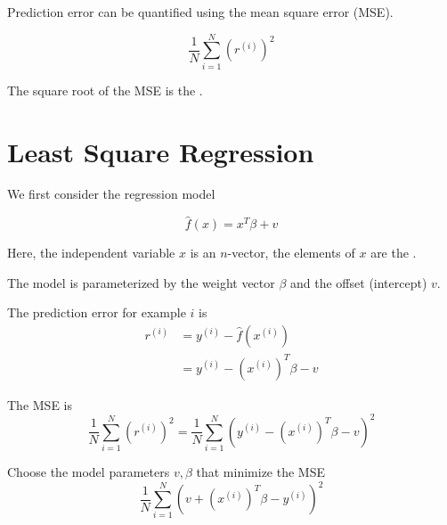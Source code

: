 Prediction error can be quantified using the mean square error (MSE).

\begin{definition}
    $$
\frac{1}{N} \sum_{i=1}^{N}\left(r^{(i)}\right)^{2}
$$
\end{definition}

The square root of the MSE is the .

\section{Least Square Regression}

We first consider the regression model

\begin{problem}
    $$
    \hat{f}(x)=x^{T} \beta+v
    $$ 

    Here, the independent variable $ x $ is an $ n $-vector, the elements of $ x $ are the .
    
\end{problem}

The model is parameterized by the weight vector $ \beta $ and the offset (intercept) $ v $.

\begin{theorem}
    The prediction error for example $ i $ is
$$
\begin{aligned}
r^{(i)} &=y^{(i)}-\hat{f}\left(x^{(i)}\right) \\
&=y^{(i)}-\left(x^{(i)}\right)^{T} \beta-v
\end{aligned}
$$
\end{theorem}

\begin{theorem}
    The MSE is
$$
\frac{1}{N} \sum_{i=1}^{N}\left(r^{(i)}\right)^{2}=\frac{1}{N} \sum_{i=1}^{N}\left(y^{(i)}-\left(x^{(i)}\right)^{T} \beta-v\right)^{2}
$$
\end{theorem}




\begin{problem}
    Choose the model parameters $ v, \beta $ that minimize the MSE
    $$
    \frac{1}{N} \sum_{i=1}^{N}\left(v+\left(x^{(i)}\right)^{T} \beta-y^{(i)}\right)^{2}
    $$

\end{problem}


